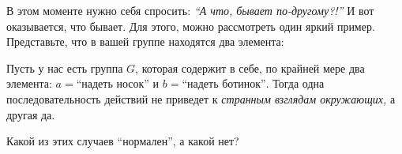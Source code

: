В этом моменте нужно себя спросить: \emph{``А что, бывает по-другому?!''} И вот оказывается, что бывает.
Для этого, можно рассмотреть один яркий пример. Представьте, что в вашей группе находятся два элемента: 
\begin{example}
    Пусть у нас есть группа $G$, которая содержит в себе, по крайней мере два элемента: 
    $a = \text{``надеть носок''}$ и $b = \text{``надеть ботинок''}$.
    Тогда одна последовательность действий не приведет к \emph{странным взглядам окружающих,} а другая да.
\end{example}

\begin{practice}
   Какой из этих случаев ``нормален'', а какой нет? 
\end{practice}
